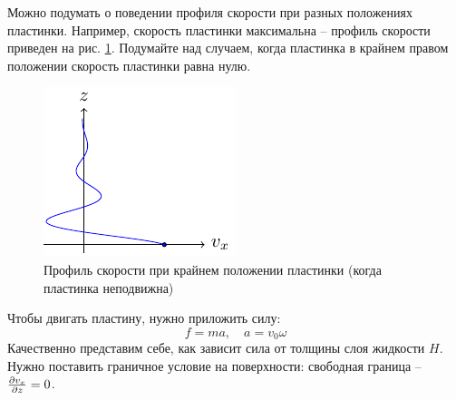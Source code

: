 Можно подумать о поведении профиля скорости при разных положениях пластинки. 
Например, скорость пластинки максимальна – профиль скорости приведен на рис. \ref{fig:krai}. Подумайте над случаем, когда пластинка в крайнем правом положении скорость пластинки равна нулю.

\begin{figure}[tb]
    \centering
    \includegraphics[scale=1.5]{img/krai}
    \caption{Профиль скорости при крайнем положении пластинки (когда пластинка неподвижна)}
    \label{fig:krai}
\end{figure}





Чтобы двигать пластину, нужно приложить силу:
\begin{equation}
    f=ma, \quad a=v_0 \omega
\end{equation}
Качественно представим себе, как зависит сила от толщины слоя жидкости $H$. Нужно поставить граничное условие на поверхности: свободная граница -- $\pdv{v_x}{z}=0$.


